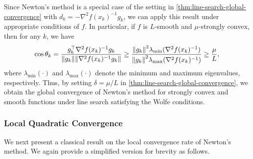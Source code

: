 \documentclass[0_en]{subfiles}
\begin{document}
Since Newton's method is a special case of the setting in \cref{thm:line-search-global-convergence} with $d_k = -\nabla^2 f(x_k)^{-1} g_k$, we can apply this result under appropriate conditions of $f$.
In particular, if $f$ is $L$-smooth and $\mu$-strongly convex, then for any $k$, we have
\begin{equation*}
    \cos \theta_k
    = \frac{g_k^\top \nabla^2 f(x_k)^{-1} g_k}{\norm{g_k}\norm{\nabla^2 f(x_k)^{-1} g_k}}
    \geq \frac{\norm{g_k}^2 \lambda_{\min}(\nabla^2 f(x_k)^{-1})}{\norm{g_k}^2 \lambda_{\max}(\nabla^2 f(x_k)^{-1})}
    \geq \frac{\mu}{L},
\end{equation*}
where $\lambda_{\min}(\cdot)$ and $\lambda_{\max}(\cdot)$ denote the minimum and maximum eigenvalues, respectively.
Thus, by setting $\delta = \mu / L$ in \cref{thm:line-search-global-convergence}, we obtain the global convergence of Newton's method for strongly convex and smooth functions under line search satisfying the Wolfe conditions.

\subsubsection{Local Quadratic Convergence}

We next present a classical result on the local convergence rate of Newton's method.
We again provide a simplified version for brevity as follows.
\end{document}
